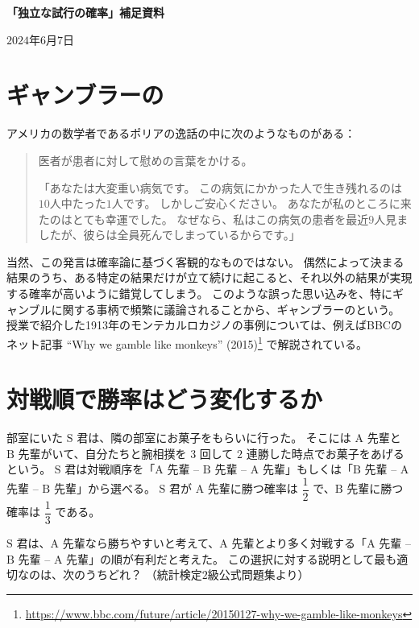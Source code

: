 \documentclass[12pt]{ltjsarticle}
\begin{document}
\pagestyle{empty}

{\LARGE%
\noindent
\textbf{%
「独立な試行の確率」補足資料
}}

\begin{flushleft}
$2024$年$6$月$7$日 \\
\end{flushleft}

\section{ギャンブラーの}

アメリカの数学者であるポリアの逸話の中に次のようなものがある：
\begin{quotation}
  医者が患者に対して慰めの言葉をかける。
  
  「あなたは大変重い病気です。
  この病気にかかった人で生き残れるのは$10$人中たった$1$人です。
  しかしご安心ください。
  あなたが私のところに来たのはとても幸運でした。
  なぜなら、私はこの病気の患者を最近$9$人見ましたが、彼らは全員死んでしまっているからです。」
\end{quotation}
当然、この発言は確率論に基づく客観的なものではない。
偶然によって決まる結果のうち、ある特定の結果だけが立て続けに起こると、それ以外の結果が実現する確率が高いように錯覚してしまう。
このような誤った思い込みを、特にギャンブルに関する事柄で頻繁に議論されることから、ギャンブラーのという。
授業で紹介した1913年のモンテカルロカジノの事例については、例えばBBCのネット記事 ``Why we gamble like monkeys'' (2015)\footnote{%
  \url{https://www.bbc.com/future/article/20150127-why-we-gamble-like-monkeys}
}
で解説されている。

\section{対戦順で勝率はどう変化するか}

部室にいた $\mathrm{S}$ 君は、隣の部室にお菓子をもらいに行った。
そこには $\mathrm{A}$ 先輩と $\mathrm{B}$ 先輩がいて、自分たちと腕相撲を $3$ 回して $2$ 連勝した時点でお菓子をあげるという。
$\mathrm{S}$ 君は対戦順序を「$\mathrm{A}$ 先輩 -- $\mathrm{B}$ 先輩 -- $\mathrm{A}$ 先輩」もしくは「$\mathrm{B}$ 先輩 -- $\mathrm{A}$ 先輩 -- $\mathrm{B}$ 先輩」から選べる。
$\mathrm{S}$ 君が $\mathrm{A}$ 先輩に勝つ確率は $\dfrac{1}{2}$ で、$\mathrm{B}$ 先輩に勝つ確率は $\dfrac{1}{3}$ である。

$\mathrm{S}$ 君は、$\mathrm{A}$ 先輩なら勝ちやすいと考えて、$\mathrm{A}$ 先輩とより多く対戦する「$\mathrm{A}$ 先輩 -- $\mathrm{B}$ 先輩 -- $\mathrm{A}$ 先輩」の順が有利だと考えた。
この選択に対する説明として最も適切なのは、次のうちどれ？
（統計検定$2$級公式問題集より）
\end{document}
